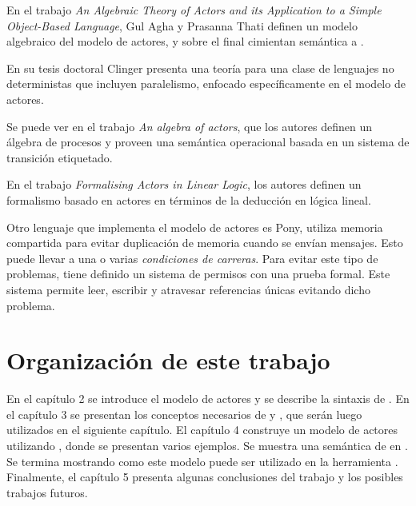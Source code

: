En el trabajo \textit{An Algebraic Theory of Actors and its Application to a Simple Object-Based Language}\cite{apicalculus}, Gul Agha y Prasanna Thati definen un modelo algebraico del modelo de actores, y sobre el final cimientan semántica a \SAL.

En su tesis doctoral Clinger\cite{Clinger:1981} presenta una teoría para una clase de lenguajes no deterministas que incluyen paralelismo, enfocado específicamente en el modelo de actores.

Se puede ver en el trabajo \textit{An algebra of actors}\cite{algebraActors}, que los autores definen un álgebra de procesos y proveen una semántica operacional basada en un sistema de transición etiquetado.

En el trabajo \textit{Formalising Actors in Linear Logic}\cite{actorLiniarLogic}, los autores definen un formalismo basado en actores en términos de la deducción en lógica lineal.

Otro lenguaje que implementa el modelo de actores es Pony\cite{ponylang}, utiliza memoria compartida para evitar duplicación de memoria cuando se envían mensajes. Esto puede llevar a una o varias \textit{condiciones de carreras}. Para evitar este tipo de problemas, tiene definido un sistema de permisos con una prueba formal\cite{Clebsch:2015:DCS:2824815.2824816}. Este sistema permite leer, escribir y atravesar referencias únicas evitando dicho problema.

\section{Organización de este trabajo}

En el capítulo 2 se introduce el modelo de actores y se describe la sintaxis de \SAL. En el capítulo 3 se presentan los conceptos necesarios de \CSP y \CSPm, que serán luego utilizados en el siguiente capítulo. El capítulo 4 construye un modelo de actores utilizando \CSP, donde se presentan varios ejemplos. Se muestra una semántica de \SAL en \CSP. Se termina mostrando como este modelo puede ser utilizado en la herramienta \FDR. Finalmente, el capítulo 5 presenta algunas conclusiones del trabajo y los posibles trabajos futuros.
